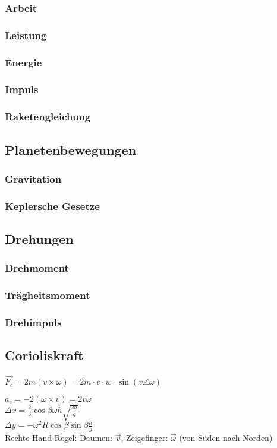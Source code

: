\documentclass[german, 8pt]{latex4ei/latex4ei_sheet}
\begin{document}
\subsubsection{Arbeit}
\subsubsection{Leistung}
\subsubsection{Energie}
\subsubsection{Impuls}
\subsubsection{Raketengleichung}
\subsection{Planetenbewegungen}
\subsubsection{Gravitation}
\subsubsection{Keplersche Gesetze}
\subsection{Drehungen}
\subsubsection{Drehmoment}
\subsubsection{Trägheitsmoment}
\subsubsection{Drehimpuls}
\subsection{Corioliskraft}
\begin{emphbox}
$\vec{F_c}=2m(v\times \omega)= 2m \cdot v \cdot w	\cdot \sin{(v\angle \omega)}$
\end{emphbox}
$a_c=-2(\omega \times v)=2v\omega$\\
$\Delta x= \frac{2}{3}\cos \beta \omega h \sqrt{\frac{2h}{g}}$\\
$\Delta y = -\omega^2R\cos \beta \sin \beta \frac{h}{g}$\\
Rechte-Hand-Regel: Daumen: $\vec{v}$, Zeigefinger: $\vec{\omega}$ (von Süden nach Norden)\\
\end{document}
